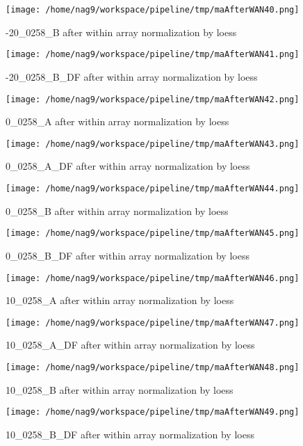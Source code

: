 \documentclass[titlepage]{article}
\begin{document}
\begin{figure}[htb!]
\centering\texttt{[image: /home/nag9/workspace/pipeline/tmp/maAfterWAN40.png]}
\caption{-20\_0258\_B after within array normalization by loess}
 \end{figure}\pagebreak
\begin{figure}[htb!]
\centering\texttt{[image: /home/nag9/workspace/pipeline/tmp/maAfterWAN41.png]}
\caption{-20\_0258\_B\_DF after within array normalization by loess}
 \end{figure}\pagebreak
\begin{figure}[htb!]
\centering\texttt{[image: /home/nag9/workspace/pipeline/tmp/maAfterWAN42.png]}
\caption{0\_0258\_A after within array normalization by loess}
 \end{figure}\pagebreak
\begin{figure}[htb!]
\centering\texttt{[image: /home/nag9/workspace/pipeline/tmp/maAfterWAN43.png]}
\caption{0\_0258\_A\_DF after within array normalization by loess}
 \end{figure}\pagebreak
\begin{figure}[htb!]
\centering\texttt{[image: /home/nag9/workspace/pipeline/tmp/maAfterWAN44.png]}
\caption{0\_0258\_B after within array normalization by loess}
 \end{figure}\pagebreak
\begin{figure}[htb!]
\centering\texttt{[image: /home/nag9/workspace/pipeline/tmp/maAfterWAN45.png]}
\caption{0\_0258\_B\_DF after within array normalization by loess}
 \end{figure}\pagebreak
\begin{figure}[htb!]
\centering\texttt{[image: /home/nag9/workspace/pipeline/tmp/maAfterWAN46.png]}
\caption{10\_0258\_A after within array normalization by loess}
 \end{figure}\pagebreak
\begin{figure}[htb!]
\centering\texttt{[image: /home/nag9/workspace/pipeline/tmp/maAfterWAN47.png]}
\caption{10\_0258\_A\_DF after within array normalization by loess}
 \end{figure}\pagebreak
\begin{figure}[htb!]
\centering\texttt{[image: /home/nag9/workspace/pipeline/tmp/maAfterWAN48.png]}
\caption{10\_0258\_B after within array normalization by loess}
 \end{figure}\pagebreak
\begin{figure}[htb!]
\centering\texttt{[image: /home/nag9/workspace/pipeline/tmp/maAfterWAN49.png]}
\caption{10\_0258\_B\_DF after within array normalization by loess}
 \end{figure}\pagebreak
\end{document}
